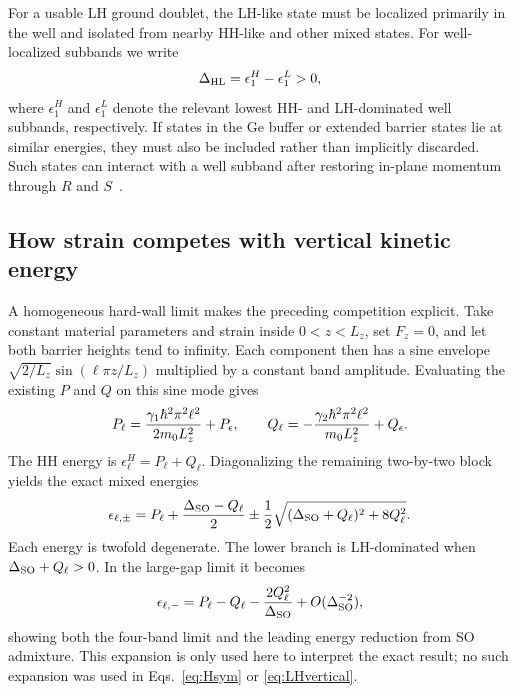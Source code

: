 For a usable LH ground doublet, the LH-like state must be localized primarily in the well and isolated from nearby HH-like and other mixed states. For well-localized subbands we write
\begin{equation}
\Delta_{\mathrm{HL}}=\epsilon_1^H-\epsilon_1^L>0,
\label{eq:DHL}
\end{equation}
where $\epsilon_1^H$ and $\epsilon_1^L$ denote the relevant lowest HH- and LH-dominated well subbands, respectively. If states in the Ge buffer or extended barrier states lie at similar energies, they must also be included rather than implicitly discarded. Such states can interact with a well subband after restoring in-plane momentum through $R$ and $S$~\cite{valvo,delvecchio2024}.

\subsection{How strain competes with vertical kinetic energy}

A homogeneous hard-wall limit makes the preceding competition explicit. Take constant material parameters and strain inside $0<z<L_z$, set $F_z=0$, and let both barrier heights tend to infinity. Each component then has a sine envelope $\sqrt{2/L_z}\sin(\ell\pi z/L_z)$ multiplied by a constant band amplitude. Evaluating the existing $P$ and $Q$ on this sine mode gives
\begin{equation}
P_\ell=\frac{\gamma_1\hbar^2\pi^2\ell^2}{2m_0L_z^2}+P_\epsilon,
\qquad
Q_\ell=-\frac{\gamma_2\hbar^2\pi^2\ell^2}{m_0L_z^2}+Q_\epsilon.
\label{eq:hardwallPQ}
\end{equation}
The HH energy is $\epsilon_\ell^H=P_\ell+Q_\ell$. Diagonalizing the remaining two-by-two block yields the exact mixed energies
\begin{equation}
\epsilon_{\ell,\pm}
=P_\ell+\frac{\Delta_{\mathrm{SO}}-Q_\ell}{2}
\pm\frac12\sqrt{(\Delta_{\mathrm{SO}}+Q_\ell)^2+8Q_\ell^2}.
\label{eq:hardwalleigen}
\end{equation}
Each energy is twofold degenerate. The lower branch is LH-dominated when $\Delta_{\mathrm{SO}}+Q_\ell>0$. In the large-gap limit it becomes
\begin{equation}
\epsilon_{\ell,-}
=P_\ell-Q_\ell-\frac{2Q_\ell^2}{\Delta_{\mathrm{SO}}}
+O(\Delta_{\mathrm{SO}}^{-2}),
\label{eq:largegap}
\end{equation}
showing both the four-band limit and the leading energy reduction from SO admixture. This expansion is only used here to interpret the exact result; no such expansion was used in Eqs.~\eqref{eq:Hsym} or \eqref{eq:LHvertical}.

